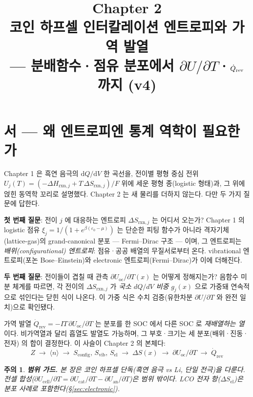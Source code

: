 \documentclass[11pt,a4paper]{article}
\title{\textbf{\LARGE Chapter 2}\\[0.35em]
  \Large 코인 하프셀 인터칼레이션 엔트로피와 가역 발열\\[0.2em]
  \large --- 분배함수·점유 분포에서 $\partial U/\partial T$·$\dot{Q}_\rev$ 까지 (v4)}
\author{}\date{}
\newtheorem*{warnbox}{주의}
\newcommand{\dd}{\mathrm{d}}
\newcommand{\rxn}{\mathrm{rxn}}
\newcommand{\rev}{\mathrm{rev}}
\newcommand{\oc}{\mathrm{oc}}
\newcommand{\config}{\mathrm{config}}
\newcommand{\vib}{\mathrm{vib}}
\newcommand{\elec}{\mathrm{el}}
\begin{document}
\maketitle
\tableofcontents
\newpage

\section*{서 — 왜 엔트로피엔 통계 역학이 필요한가}
\label{sec:intro}

Chapter 1 은 흑연 음극의 $\dd Q/\dd V$ 한 곡선을,
전이별 평형 중심 전위 $U_j(T) = (-\Delta H_{\rxn,j} + T\,\Delta S_{\rxn,j})/F$ 위에 세운
평형 종(logistic 형태)과, 그 위에 얹힌 동역학 꼬리로 설명했다.
Chapter 2 는 새 물리를 더하지 않는다. 다만 두 가지 질문에 답한다.

\textbf{첫 번째 질문}: 전이 $j$ 에 대응하는 엔트로피 $\Delta S_{\rxn,j}$ 는 어디서 오는가?
Chapter 1 의 logistic 점유 $\xi_j = 1/(1+e^{\beta(\varepsilon_0-\mu)})$ 는 단순한 피팅 함수가 아니라
격자기체(lattice-gas)의 grand-canonical 분포 — Fermi--Dirac 구조 — 이며,
그 엔트로피는 \emph{배위(configurational) 엔트로피}: 점유·공공 배열의 무질서로부터 온다.
vibrational 엔트로피(포논 Bose--Einstein)와 electronic 엔트로피(Fermi--Dirac)가 이에 더해진다.

\textbf{두 번째 질문}: 전이들이 겹칠 때 관측 $\partial U_\oc/\partial T(x)$ 는 어떻게 정해지는가?
음함수 미분 체계를 따르면, 각 전이의 $\Delta S_{\rxn,j}$ 가
\emph{국소 $dQ/dV$ 비중} $g_j(x)$ 으로 가중돼 연속적으로 섞인다는 닫힌 식이 나온다.
이 가중 식은 수치 검증(유한차분 $\partial U/\partial T$ 와 완전 일치)으로 확인됐다.

가역 발열 $\dot Q_\rev = -IT\,\partial U_\oc/\partial T$ 는 분포를 한 SOC 에서 다른 SOC 로
\emph{재배열하는 열}이다. 비가역열과 달리 흡열도 발열도 가능하며, 그 부호·크기는
세 분포(배위·진동·전자) 의 합이 결정한다. 이 사슬이 Chapter 2 의 본체다:
\[
\boxed{\;
  Z \;\to\; \langle n\rangle \;\to\; S_\config,\,S_\vib,\,S_\elec
  \;\to\; \Delta S(x) \;\to\; \partial U_\oc/\partial T
  \;\to\; \dot Q_\rev \;
}
\]

\begin{warnbox}
\textbf{범위 가드.} 본 장은 \emph{코인 하프셀 단독}(흑연 음극 vs Li, 단일 전극)을 다룬다.
전셀 합성($\partial U_\mathrm{cell}/\partial T = \partial U_\mathrm{cat}/\partial T - \partial U_\mathrm{an}/\partial T$)은
범위 밖이다. LCO 전자 항($\Delta S_\elec$)은 분포 사례로 포함한다(§\ref{sec:electronic}).
\end{warnbox}
\end{document}
